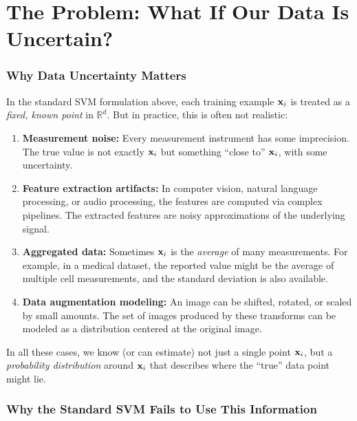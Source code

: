\documentclass[11pt, letterpaper]{article}
\newcommand{\R}{\mathbb{R}}
\begin{document}
\part{The Problem: What If Our Data Is Uncertain?}

\section{Why Data Uncertainty Matters}

In the standard SVM formulation above, each training example $\vb{x}_i$ is treated as a \emph{fixed, known point} in $\R^d$. But in practice, this is often not realistic:
\begin{enumerate}[leftmargin=2em]
    \item \textbf{Measurement noise:} Every measurement instrument has some imprecision. The true value is not exactly $\vb{x}_i$ but something ``close to'' $\vb{x}_i$, with some uncertainty.
    \item \textbf{Feature extraction artifacts:} In computer vision, natural language processing, or audio processing, the features are computed via complex pipelines. The extracted features are noisy approximations of the underlying signal.
    \item \textbf{Aggregated data:} Sometimes $\vb{x}_i$ is the \emph{average} of many measurements. For example, in a medical dataset, the reported value might be the average of multiple cell measurements, and the standard deviation is also available.
    \item \textbf{Data augmentation modeling:} An image can be shifted, rotated, or scaled by small amounts. The set of images produced by these transforms can be modeled as a distribution centered at the original image.
\end{enumerate}
In all these cases, we know (or can estimate) not just a single point $\vb{x}_i$, but a \emph{probability distribution} around $\vb{x}_i$ that describes where the ``true'' data point might lie.

\section{Why the Standard SVM Fails to Use This Information}
\end{document}
